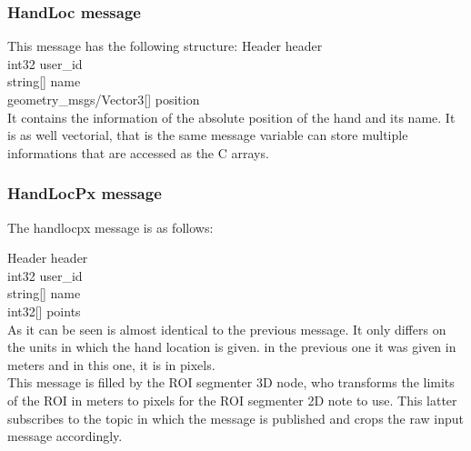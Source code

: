 \subsubsection{HandLoc message}
This message has the following structure: 
Header header\\
int32 user\_id\\
string[] name\\
geometry\_msgs/Vector3[] position
\\

It contains the information of the absolute position of the hand and its name. It is as well vectorial, that is the same message variable can store multiple informations that are accessed as the C arrays. 

\subsubsection{HandLocPx message}
The handlocpx message is as follows: 

Header header\\
int32 user\_id\\
string[] name\\
int32[] points\\

As it can be seen is almost identical to the previous message. It only differs on the units in which the hand location is given. in the previous one it was given in meters and in this one, it is in pixels. 
\\

This message is filled by the ROI segmenter 3D node, who transforms the limits of the ROI in meters to pixels for the ROI segmenter 2D note to use. This latter subscribes to the topic in which the message is published and crops the raw input message accordingly. 